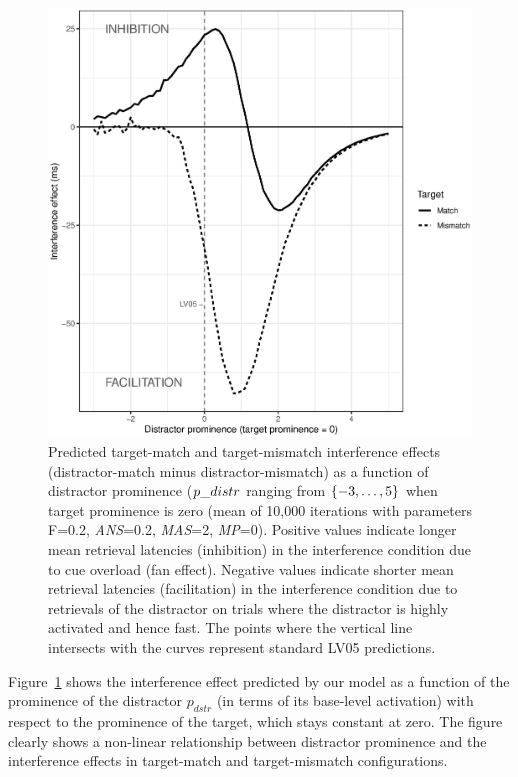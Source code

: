 \documentclass{cambridge7A}\usepackage[]{graphicx}\usepackage[]{color}
\newenvironment{knitrout}{}{} %
\begin{document}
\begin{figure}[!htbp]
\centering
\begin{knitrout}
\color{fgcolor}

{\centering \includegraphics[width=.8\textwidth]{figures/fig-prominenceNew-1} 

}



\end{knitrout}
 \caption{Predicted target-match and target-mismatch interference effects (distractor-match minus distractor-mismatch) as a function of distractor prominence ($\protect p\_{distr}$ ranging from $\protect\{-3,\dots,5\}$ when target prominence is zero (mean of 10,000 iterations with parameters F=0.2, \textit{ANS}=0.2, \textit{MAS}=2, \textit{MP}=0). Positive values indicate longer mean retrieval latencies (inhibition) in the interference condition due to  cue overload  (fan effect). Negative values indicate shorter mean retrieval latencies (facilitation) in the interference condition due to retrievals of the distractor on trials where the distractor is highly activated and hence fast. The points where the vertical line intersects with the curves represent standard LV05 predictions.}\label{fig:prominenceNew} 
\end{figure}

Figure~\ref{fig:prominenceNew} shows the interference effect predicted by  our model as a function of the prominence of the distractor $p_{dstr}$ (in terms of its base-level activation) with respect to the prominence of the target, which stays constant at zero. 
The figure clearly shows a non-linear relationship between distractor prominence and the interference effects in target-match and target-mismatch configurations. 
\end{document}
